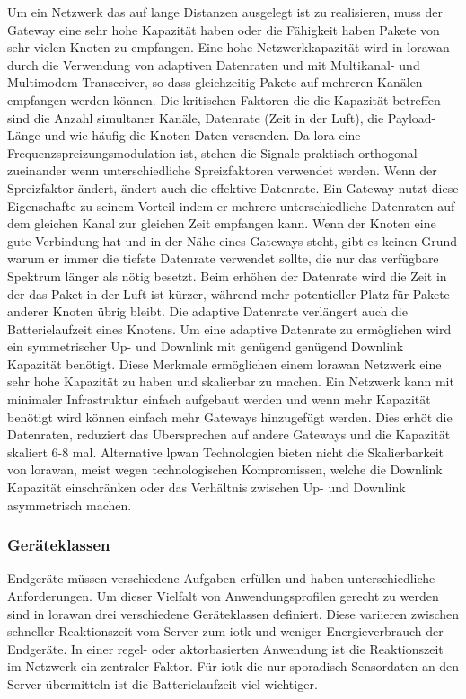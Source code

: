 Um ein Netzwerk das auf lange Distanzen ausgelegt ist zu realisieren, muss der Gateway eine sehr hohe Kapazität haben oder die Fähigkeit haben Pakete von sehr vielen Knoten zu empfangen. Eine hohe Netzwerkkapazität wird in \gls{lorawan} durch die Verwendung von adaptiven Datenraten und mit Multikanal- und Multimodem Transceiver, so dass gleichzeitig Pakete auf mehreren Kanälen empfangen werden können. Die kritischen Faktoren die die Kapazität betreffen sind die Anzahl simultaner Kanäle, Datenrate (Zeit in der Luft), die Payload-Länge und wie häufig die Knoten Daten versenden. Da \gls{lora} eine Frequenzspreizungsmodulation ist, stehen die Signale praktisch orthogonal zueinander wenn unterschiedliche Spreizfaktoren verwendet werden. Wenn der Spreizfaktor ändert, ändert auch die effektive Datenrate. Ein Gateway nutzt diese Eigenschafte zu seinem Vorteil indem er mehrere unterschiedliche Datenraten auf dem gleichen Kanal zur gleichen Zeit empfangen kann. Wenn der Knoten eine gute Verbindung hat und in der Nähe eines Gateways steht, gibt es keinen Grund warum er immer die tiefste Datenrate verwendet sollte, die nur das verfügbare Spektrum länger als nötig besetzt. Beim erhöhen der Datenrate wird die Zeit in der das Paket in der Luft ist kürzer, während mehr potentieller Platz für Pakete anderer Knoten übrig bleibt. Die adaptive Datenrate verlängert auch die Batterielaufzeit eines Knotens. Um eine adaptive Datenrate zu ermöglichen wird ein symmetrischer Up- und Downlink mit genügend genügend Downlink Kapazität benötigt. Diese Merkmale ermöglichen einem \gls{lorawan} Netzwerk eine sehr hohe Kapazität zu haben und skalierbar zu machen. Ein Netzwerk kann mit minimaler Infrastruktur einfach aufgebaut werden und wenn mehr Kapazität benötigt wird können einfach mehr Gateways hinzugefügt werden. Dies erhöt die Datenraten, reduziert das Übersprechen auf andere Gateways und die Kapazität skaliert 6-8 mal. Alternative \gls{lpwan} Technologien bieten nicht die Skalierbarkeit von \gls{lorawan}, meist wegen technologischen Kompromissen, welche die Downlink Kapazität einschränken oder das Verhältnis zwischen Up- und Downlink asymmetrisch machen.

\subsubsection*{Geräteklassen}

Endgeräte müssen verschiedene Aufgaben erfüllen und haben unterschiedliche Anforderungen. Um dieser Vielfalt von Anwendungsprofilen gerecht zu werden sind in \gls{lorawan} drei verschiedene Geräteklassen definiert. Diese variieren zwischen schneller Reaktionszeit vom Server zum \gls{iotk} und weniger Energieverbrauch der Endgeräte. In einer regel- oder aktorbasierten Anwendung ist die Reaktionszeit im Netzwerk ein zentraler Faktor. Für \gls{iotk} die nur sporadisch Sensordaten an den Server übermitteln ist die Batterielaufzeit viel wichtiger.

